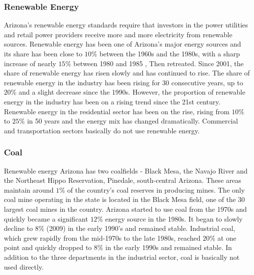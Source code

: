 \documentclass{mcmthesis}
\begin{document}
\subsubsection{Renewable Energy}
  Arizona's renewable energy standards require that investors in the power utilities and retail power providers receive more and more electricity
  from renewable sources. Renewable energy has been one of Arizona's major energy sources and its share has been close to $10\%$ between the 1960s
  and the 1980s, with a sharp increase of nearly $15\%$ between 1980 and 1985 , Then retreated. Since 2001, the share of renewable energy has risen
  slowly and has continued to rise. The share of renewable energy in the industry has been rising for 30 consecutive years, up to $20\%$ and
  a slight decrease since the 1990s. However, the proportion of renewable energy in the industry has been on a rising trend since the 21st century.
  Renewable energy in the residential sector has been on the rise, rising from $10\%$ to $25\%$ in 50 years and the energy mix has changed dramatically.
  Commercial and transportation sectors basically do not use renewable energy.
\subsubsection{Coal}
  Renewable energy Arizona has two coalfields - Black Mesa, the Navajo River and the Northeast Hippo Reservation, Pinedale, south-central Arizona.
  These areas maintain around $1\%$ of the country's coal reserves in producing mines. The only coal mine operating in the state is located in the Black
  Mesa field, one of the 30 largest coal mines in the country. Arizona started to use coal from the 1970s and quickly became a significant $12\%$ energy
  source in the 1980s. It began to slowly decline to $8\%$ (2009) in the early 1990's and remained stable. Industrial coal,
  which grew rapidly from the mid-1970s to the late 1980s, reached $20\%$ at one point and quickly dropped to $8\%$ in the early 1990s and remained stable.
  In addition to the three departments in the industrial sector, coal is basically not used directly.
\end{document}
